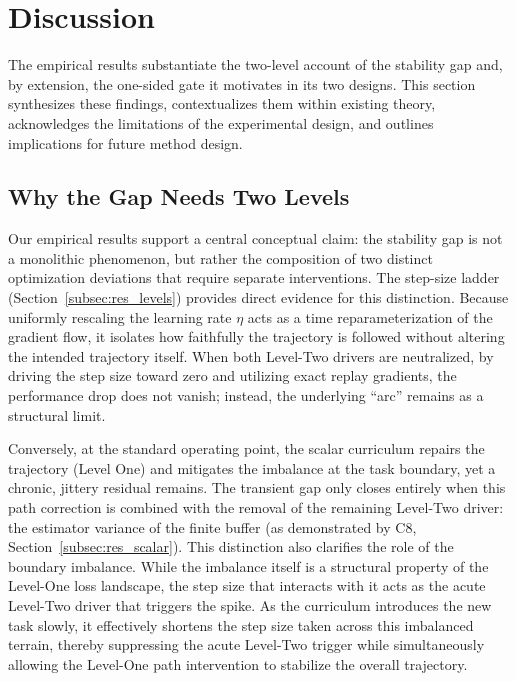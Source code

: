 \section{Discussion}
\label{sec:discussion}

The empirical results substantiate the two-level account of the stability gap and, by extension, the one-sided gate it motivates in its two designs. This section synthesizes these findings, contextualizes them within existing theory, acknowledges the limitations of the experimental design, and outlines implications for future method design.

\subsection{Why the Gap Needs Two Levels}
\label{subsec:disc_twolevel}

Our empirical results support a central conceptual claim: the stability gap is not a monolithic phenomenon, but rather the composition of two distinct optimization deviations that require separate interventions. The step-size ladder (Section~\ref{subsec:res_levels}) provides direct evidence for this distinction. Because uniformly rescaling the learning rate $\eta$ acts as a time reparameterization of the gradient flow, it isolates how faithfully the trajectory is followed without altering the intended trajectory itself. When both Level-Two drivers are neutralized, by driving the step size toward zero and utilizing exact replay gradients, the performance drop does not vanish; instead, the underlying ``arc'' remains as a structural limit.

Conversely, at the standard operating point, the scalar curriculum repairs the trajectory (Level One) and mitigates the imbalance at the task boundary, yet a chronic, jittery residual remains. The transient gap only closes entirely when this path correction is combined with the removal of the remaining Level-Two driver: the estimator variance of the finite buffer (as demonstrated by C8, Section~\ref{subsec:res_scalar}). This distinction also clarifies the role of the boundary imbalance. While the imbalance itself is a structural property of the Level-One loss landscape, the step size that interacts with it acts as the acute Level-Two driver that triggers the spike. As the curriculum introduces the new task slowly, it effectively shortens the step size taken across this imbalanced terrain, thereby suppressing the acute Level-Two trigger while simultaneously allowing the Level-One path intervention to stabilize the overall trajectory.

